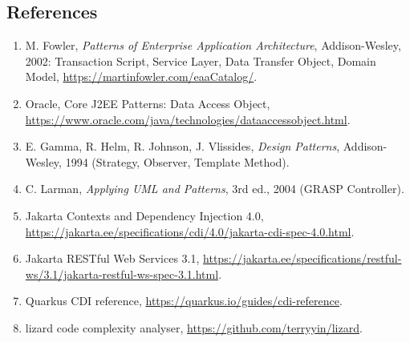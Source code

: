 \documentclass[11pt,a4paper]{article}
\begin{document}
\subsection{References}
\begin{enumerate}\item M. Fowler, \textit{Patterns of Enterprise Application Architecture}, Addison-Wesley, 2002: Transaction Script, Service Layer, Data Transfer Object, Domain Model, \url{https://martinfowler.com/eaaCatalog/}.\item Oracle, Core J2EE Patterns: Data Access Object, \url{https://www.oracle.com/java/technologies/dataaccessobject.html}.\item E. Gamma, R. Helm, R. Johnson, J. Vlissides, \textit{Design Patterns}, Addison-Wesley, 1994 (Strategy, Observer, Template Method).\item C. Larman, \textit{Applying UML and Patterns}, 3rd ed., 2004 (GRASP Controller).\item Jakarta Contexts and Dependency Injection 4.0, \url{https://jakarta.ee/specifications/cdi/4.0/jakarta-cdi-spec-4.0.html}.\item Jakarta RESTful Web Services 3.1, \url{https://jakarta.ee/specifications/restful-ws/3.1/jakarta-restful-ws-spec-3.1.html}.\item Quarkus CDI reference, \url{https://quarkus.io/guides/cdi-reference}.\item lizard code complexity analyser, \url{https://github.com/terryyin/lizard}.\end{enumerate}
\end{document}
